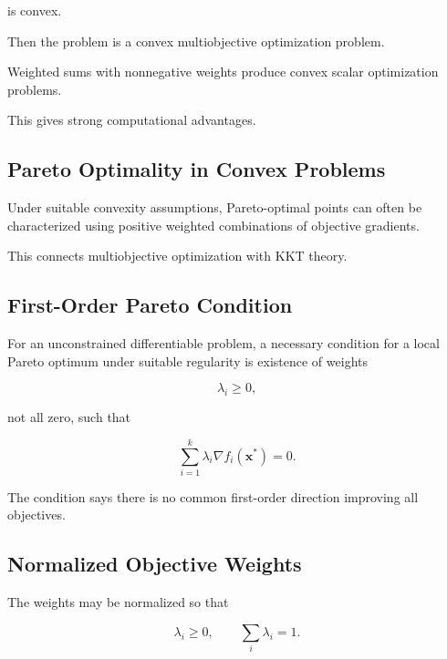 is convex.

Then the problem is a convex multiobjective optimization problem.

Weighted sums with nonnegative weights produce convex scalar optimization
problems.

This gives strong computational advantages.

\subsection{Pareto Optimality in Convex Problems}
\label{subsec:pareto-convex-problems}

Under suitable convexity assumptions, Pareto-optimal points can often be
characterized using positive weighted combinations of objective
gradients.

This connects multiobjective optimization with KKT theory.

\subsection{First-Order Pareto Condition}
\label{subsec:first-order-pareto-condition}

For an unconstrained differentiable problem, a necessary condition for a
local Pareto optimum under suitable regularity is existence of weights

\[
\lambda_i\geq0,
\]

not all zero, such that

\[
\boxed{
\sum_{i=1}^{k}
\lambda_i
\nabla f_i(\mathbf{x}^*)
=
0.
}
\]

The condition says there is no common first-order direction improving all
objectives.

\subsection{Normalized Objective Weights}
\label{subsec:normalized-objective-weights}

The weights may be normalized so that

\[
\boxed{
\lambda_i\geq0,
\qquad
\sum_i\lambda_i=1.
}
\]

